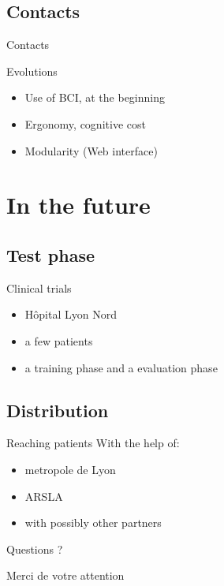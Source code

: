 \documentclass[notes]{beamer}
\begin{document}
\subsection{Contacts}
\begin{frame}{Contacts}
	\begin{center}
	\end{center}
\end{frame}

\begin{frame}{Evolutions}
	\begin{center}
		\begin{itemize}
			\item Use of BCI, at the beginning
			\item Ergonomy, cognitive cost %
			\item Modularity (Web interface)
		\end{itemize}
	\end{center}
\end{frame}

\section{In the future}
\subsection{Test phase}
\begin{frame}{Clinical trials}
	\begin{center}
		\begin{itemize}
			\item Hôpital Lyon Nord %
			\item a few patients
			\item a training phase and a evaluation phase %
		\end{itemize}
	\end{center}
\end{frame}

\subsection{Distribution}
\begin{frame}{Reaching patients}
	With the help of: 
	\begin{itemize}
		\item metropole de Lyon
		\item ARSLA
		\item with possibly other partners %
	\end{itemize}
\end{frame}

\begin{frame}{Questions ?}
	\begin{center}
		Merci de votre attention
	\end{center}
\end{frame}
\end{document}
